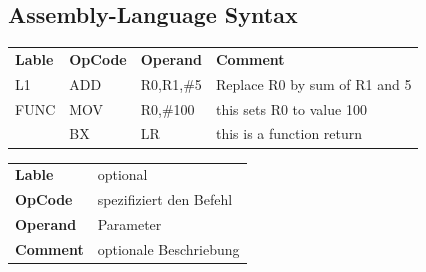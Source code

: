 \subsection{Assembly-Language Syntax}
\begin{tabular}{llll}
    \textbf{Lable}  &\textbf{OpCode}  &\textbf{Operand}  & \textbf{Comment} \\ 
    L1  & ADD &R0,R1,\#5    & Replace R0 by sum of R1 and 5 \\ 
    FUNC& MOV &R0,\#100     & this sets R0 to value 100 \\  
        & BX  &LR           & this is a function return\\
\end{tabular} 
\begin{tabular}{|ll}
    \textbf{Lable}  & optional  \\ 
    \textbf{OpCode} & spezifiziert den Befehl \\ 
    \textbf{Operand}& Parameter  \\ 
    \textbf{Comment}&  optionale Beschriebung\\ 
\end{tabular} 
\\
